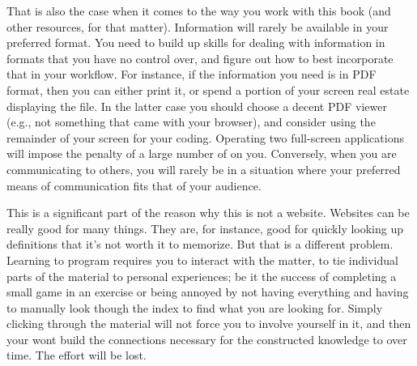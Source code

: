 That is also the case when it comes to the way you work with this book (and other resources, for that matter). Information will rarely be available in your preferred format. You need to build up skills for dealing with information in formats that you have no control over, and figure out how to best incorporate that in your workflow. For instance, if the information you need is in PDF format, then you can either print it, or spend a portion of your screen real estate displaying the file. In the latter case you should choose a decent PDF viewer (e.g., not something that came with your browser), and consider using the remainder of your screen for your coding. Operating two full-screen applications will impose the penalty of a large number of  on you. Conversely, when you are communicating to others, you will rarely be in a situation where your preferred means of communication fits that of your audience.

This is a significant part of the reason why this is not a website. Websites can be really good for many things. They are, for instance, good for quickly looking up definitions that it's not worth it to memorize. But that is a different problem. Learning to program requires you to interact with the matter, to tie individual parts of the material to personal experiences; be it the success of completing a small game in an exercise or being annoyed by not having everything  and having to manually look though the index to find what you are looking for. Simply clicking through the material will not force you to involve yourself in it, and then your  wont build the connections necessary for the constructed knowledge to  over time. The effort will be lost.

